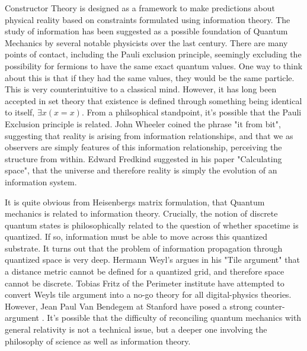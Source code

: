 \documentclass[notitlepage]{article}
\begin{document}
Constructor Theory is designed as a framework to make predictions about physical reality based on constraints formulated using information theory. The study of information has been suggested as a possible foundation of Quantum Mechanics by several notable physicists over the last century. There are many points of contact, including the Pauli exclusion principle, seemingly excluding the possibility for fermions to have the same exact quantum values. One way to think about this is that if they had the same values, they would be the same particle. This is very counterintuitive to a classical mind. However, it has long been accepted in set theory that existence is defined through something being identical to itself, $\exists x(x = x)$. From a philsophical standpoint, it's possible that the Pauli Exclusion principle is related. John Wheeler coined the phrase "it from bit", suggesting that reality is arising from information relationships, and that we as observers are simply features of this information relationship, perceiving the structure from within. Edward Fredkind suggested in his paper "Calculating space", that the universe and therefore reality is simply the evolution of an information system. 

It is quite obvious from Heisenbergs matrix formulation, that Quantum mechanics is related to information theory. Crucially, the notion of discrete quantum states is philosophically related to the question of whether spacetime is quantized. If so, information must be able to move across this quantized substrate. It turns out that the problem of information propagation through quantized space is very deep. Hermann Weyl's argues in his "Tile argument" that a distance metric cannot be defined for a quantized grid, and therefore space cannot be discrete. Tobias Fritz of the Perimeter institute have attempted to convert Weyls tile argument into a  \cite{FritzNoGo} no-go theory for all digital-physics theories. However, Jean Paul Van Bendegem at Stanford have posed a strong counter-argument \cite{stanford-geometry-finitism}. It's possible that the difficulty of reconciling quantum mechanics with general relativity is not a technical issue, but a deeper one involving the philosophy of science as well as information theory.
\end{document}

